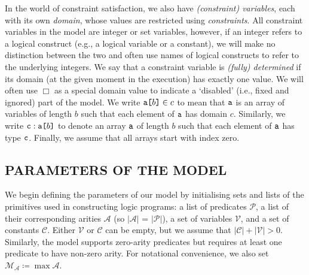 \documentclass[letterpaper]{article}
\theoremstyle{definition}
\newcommand{\variable}[1]{\texttt{\textup{#1}}}
\newcommand{\arrayd}[3]{\variable{{#1}[}{#2}\variable{]} \in {#3}}
\newcommand{\arrayt}[3]{\variable{{#3}} : \variable{{#1}[}{#2}\variable{]}}
\newcommand{\predicates}{\mathcal{P}}
\newcommand{\variables}{\mathcal{V}}
\newcommand{\constants}{\mathcal{C}}
\newcommand{\arities}{\mathcal{A}}
\newcommand{\maxArity}{\mathcal{M}_{\mathcal{A}}}
\begin{document}
In the world of constraint satisfaction, we also have \emph{(constraint)
  variables}, each with its own \emph{domain}, whose values are restricted using
\emph{constraints}. All constraint variables in the model are integer or set
variables, however, if an integer refers to a logical construct
(e.g., a logical variable or a constant), we will make no distinction between
the two and often use names of logical constructs to refer to the underlying
integers. We say that a constraint variable is \emph{(fully) determined} if its
domain (at the given moment in the execution) has exactly one value. We will
often use $\Box$ as a special domain value to indicate a `disabled' (i.e., fixed
and ignored) part of the model. We write $\arrayd{a}{b}{c}$ to mean that
$\variable{a}$ is an array of variables of length $b$ such that each element of
$\variable{a}$ has domain $c$. Similarly, we write $\arrayt{a}{b}{c}$ to denote
an array $\variable{a}$ of length $b$ such that each element of $\variable{a}$
has type $\variable{c}$. Finally, we assume that all arrays start with index
zero.

\subsection{PARAMETERS OF THE MODEL}

We begin defining the parameters of our model by initialising sets and lists
of the primitives used in constructing logic programs: a list of predicates
$\predicates{}$, a list of their corresponding arities $\arities{}$ (so
$|\arities{}|$ = $|\predicates{}|$), a set of variables $\variables{}$, and a
set of constants $\constants{}$. Either $\variables{}$ or $\constants{}$ can be
empty, but we assume that $|\constants{}| + |\variables{}| > 0$. Similarly, the
model supports zero-arity predicates but requires at least one predicate to have
non-zero arity. For notational convenience, we also set $\maxArity{} \coloneqq
\max \arities{}$.
\end{document}
